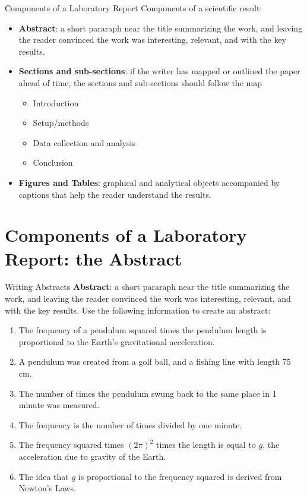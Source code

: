 \documentclass{beamer}
\begin{document}
\begin{frame}{Components of a Laboratory Report}
Components of a scientific result:
\begin{itemize}
\item \textbf{Abstract}: a short pararaph near the title summarizing the work, and leaving the reader convinced the work was interesting, relevant, and with the key results.
\item \textbf{Sections and sub-sections}: if the writer has mapped or outlined the paper ahead of time, the sections and sub-sections should follow the map
\begin{itemize}
\item Introduction
\item Setup/methods
\item Data collection and analysis
\item Conclusion
\end{itemize}
\item \textbf{Figures and Tables}: graphical and analytical objects accompanied by captions that help the reader understand the results.
\end{itemize}
\end{frame}

\section{Components of a Laboratory Report: the Abstract}

\begin{frame}{Writing Abstracts}
\small
\textbf{Abstract}: a short pararaph near the title summarizing the work, and leaving the reader convinced the work was interesting, relevant, and with the key results.  Use the following information to create an abstract:
\begin{enumerate}
\item The frequency of a pendulum squared times the pendulum length is proportional to the Earth's gravitational acceleration.
\item A pendulum was created from a golf ball, and a fishing line with length 75 cm.
\item The number of times the pendulum swung back to the same place in 1 minute was measured.
\item The frequency is the number of times divided by one minute.
\item The frequency squared times $(2\pi)^2$ times the length is equal to $g$, the acceleration due to gravity of the Earth.
\item The idea that $g$ is proportional to the frequency squared is derived from Newton's Laws.
\end{enumerate}
\end{frame}
\end{document}
